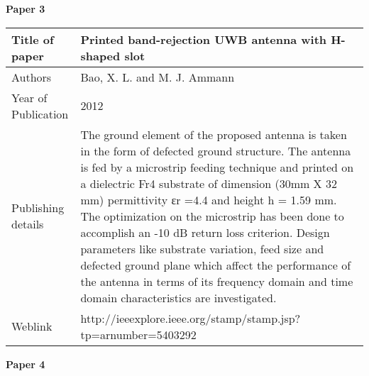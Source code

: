 \documentclass[12pt]{article}
\begin{document}
	\cleardoublepage
	
		\begin{flushleft}
			\textbf{Paper 3}
		\end{flushleft}
		

	  \begin{center}
	  	\begin{table}[h]
	  		\centering
	  		\begin{tabular}{ |l|p{11cm}| }
	  			\hline
	  			Title of paper &  Printed band-rejection UWB antenna with H-shaped slot \\
	  			\hline
	  			Authors & Bao, X. L. and M. J. Ammann \\
	  			\hline
	  			Year of Publication & 2012 \\
	  			\hline
	  			Publishing details & The ground element of the proposed antenna is taken in the form of defected ground structure. The antenna is fed by a microstrip feeding technique and printed on a dielectric Fr4 substrate of dimension (30mm X 32 mm) permittivity εr =4.4 and height h = 1.59 mm. The optimization on the microstrip has been done to accomplish an -10 dB return loss criterion. Design parameters like substrate variation, feed size and defected ground plane which affect the performance of the antenna in terms of its frequency domain and time domain characteristics are investigated.\\
	  			\hline
	  			Weblink & http://ieeexplore.ieee.org/stamp/stamp.jsp?tp=arnumber=5403292 \\
	  			\hline
	  		\end{tabular}

	  	\end{table}
	  \end{center}

	\begin{flushleft}
		\textbf{Paper 4}
	\end{flushleft}
\end{document}
